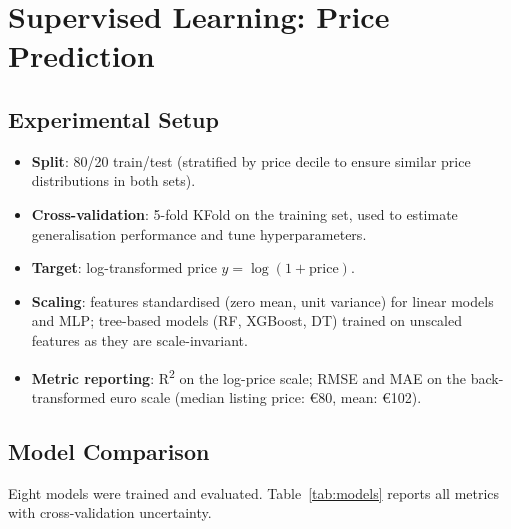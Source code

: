 \documentclass[12pt, a4paper]{article}
\begin{document}
\section{Supervised Learning: Price Prediction}
\label{sec:supervised}

\subsection{Experimental Setup}

\begin{itemize}[itemsep=2pt]
  \item \textbf{Split}: 80/20 train/test (stratified by price decile to ensure similar price distributions in both sets).
  \item \textbf{Cross-validation}: 5-fold KFold on the training set, used to estimate generalisation performance and tune hyperparameters.
  \item \textbf{Target}: log-transformed price $y = \log(1 + \text{price})$.
  \item \textbf{Scaling}: features standardised (zero mean, unit variance) for linear models and MLP; tree-based models (RF, XGBoost, DT) trained on unscaled features as they are scale-invariant.
  \item \textbf{Metric reporting}: R\textsuperscript{2} on the log-price scale; RMSE and MAE on the back-transformed euro scale (median listing price: \euro{}80, mean: \euro{}102).
\end{itemize}

\subsection{Model Comparison}

Eight models were trained and evaluated. Table~\ref{tab:models} reports all metrics with cross-validation uncertainty.
\end{document}
